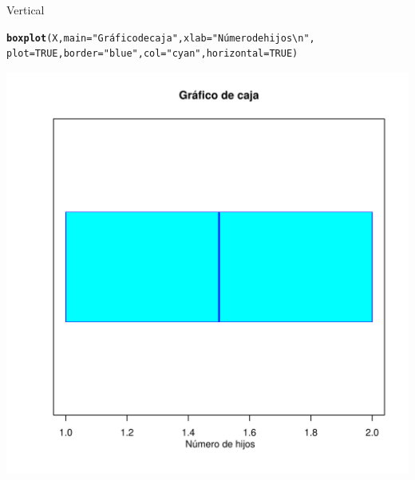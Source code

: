 \documentclass[10pt,a4paper]{article}\usepackage[]{graphicx}\usepackage[]{color}
\makeatletter
\def\maxwidth{ %
  \ifdim\Gin@nat@width>\linewidth
    \linewidth
  \else
    \Gin@nat@width
  \fi
}
\newcommand{\hlnum}[1]{\textcolor[rgb]{0.686,0.059,0.569}{#1}}%
\newcommand{\hlstr}[1]{\textcolor[rgb]{0.192,0.494,0.8}{#1}}%
\newcommand{\hlstd}[1]{\textcolor[rgb]{0.345,0.345,0.345}{#1}}%
\newcommand{\hlkwc}[1]{\textcolor[rgb]{0.333,0.667,0.333}{#1}}%
\newcommand{\hlkwd}[1]{\textcolor[rgb]{0.737,0.353,0.396}{\textbf{#1}}}%
\newenvironment{kframe}{%
 \def\at@end@of@kframe{}%
 \ifinner\ifhmode%
  \def\at@end@of@kframe{\end{minipage}}%
  \begin{minipage}{\columnwidth}%
 \fi\fi%
 \def\FrameCommand##1{\hskip\@totalleftmargin \hskip-\fboxsep
 \colorbox{shadecolor}{##1}\hskip-\fboxsep
     \hskip-\linewidth \hskip-\@totalleftmargin \hskip\columnwidth}%
 \MakeFramed {\advance\hsize-\width
   \@totalleftmargin\z@ \linewidth\hsize
   \@setminipage}}%
 {\par\unskip\endMakeFramed%
 \at@end@of@kframe}
\newenvironment{knitrout}{}{} %
\makeatother
\begin{document}
 
  
  Vertical

\begin{knitrout}
\color{fgcolor}\begin{kframe}
\begin{alltt}
  \hlkwd{boxplot}\hlstd{(X,} \hlkwc{main}\hlstd{=}\hlstr{"Gráfico de caja"}\hlstd{,} \hlkwc{xlab}\hlstd{=}\hlstr{" Número de hijos\textbackslash{}n"}\hlstd{,}
          \hlkwc{plot}\hlstd{=}\hlnum{TRUE}\hlstd{,} \hlkwc{border}\hlstd{=}\hlstr{"blue"}\hlstd{,}\hlkwc{col}\hlstd{=}\hlstr{"cyan"}\hlstd{,} \hlkwc{horizontal}\hlstd{=}\hlnum{TRUE}\hlstd{)}
\end{alltt}
\end{kframe}
\includegraphics[width=\maxwidth]{figure/unnamed-chunk-17-1} 

\end{knitrout}
 
\end{document}

